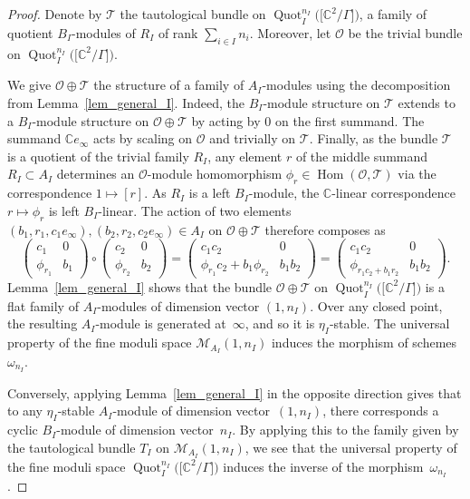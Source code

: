 \documentclass[pdftex]{sigma}%
\newcommand{\SC}{\mathbb{C}} %
\newcommand{\Hom}{\operatorname{Hom}}
\newcommand{\PiGamma}{B}
\newcommand{\PiQ}{A}
\DeclareMathOperator{\Quot}{\mathrm{Quot}}
\newcommand{\QuotI}[1][ ]{\Quot_I^{#1}}
\newcommand{\QuotInI}{\QuotI[n_I]}
\numberwithin{equation}{section}
\begin{document}
\begin{proof}
Denote by $\mathcal{T}$ the tautological bundle on $\QuotInI\big(\big[\SC^2/\Gamma\big]\big)$, a family of quotient $\PiGamma_I$-modules of $R_I$ of rank $\sum_{i \in I} n_i$. Moreover, let $\mathcal{O}$ be the trivial bundle on $\QuotInI\big(\big[\SC^2/\Gamma\big]\big)$.

We give $\mathcal{O}\oplus \mathcal{T}$ the structure of a family of $\PiQ_I$-modules using the decomposition from Lemma~\ref{lem_general_I}.
Indeed, the $\PiGamma_I$-module structure on $\mathcal{T}$ extends to a $\PiGamma_I$-module structure on $\mathcal{O}\oplus \mathcal{T}$ by acting by $0$ on the first summand. The summand $\SC e_\infty$ acts by scaling on $\mathcal{O}$ and trivially on $\mathcal{T}$. Finally, as the bundle $\mathcal{T}$ is a quotient of the trivial family $R_I$, any element $r$ of the middle summand $R_I \subset A_I$ determines an $\mathcal{O}$-module homomorphism $\phi_r \in \Hom(\mathcal{O},\mathcal{T})$ via the correspondence $1\mapsto [r]$. As $R_I$ is a left $\PiGamma_I$-module, the $\SC$-linear correspondence $r \mapsto \phi_r$ is left $\PiGamma_I$-linear. The action of two elements $(b_1,r_1,c_1 e_\infty), (b_2,r_2,c_2 e_\infty) \in \PiQ_I$ on $\mathcal{O}\oplus \mathcal{T}$ therefore composes as
\[ \begin{pmatrix}c_1 & 0 \\ \phi_{r_1} & b_1 \end{pmatrix} \circ \begin{pmatrix}c_2 & 0 \\ \phi_{r_2} & b_2 \end{pmatrix} = \begin{pmatrix}c_1c_2 & 0 \\ \phi_{r_1}c_2+b_1\phi_{r_2} & b_1b_2 \end{pmatrix}=\begin{pmatrix}c_1c_2 & 0 \\ \phi_{r_1c_2+b_1r_2} & b_1b_2 \end{pmatrix}.\]
Lemma~\ref{lem_general_I}
shows that
the bundle $\mathcal{O}\oplus \mathcal{T}$ on $\QuotInI\big(\big[\SC^2/\Gamma\big]\big)$
is a flat family of $\PiQ_I$-modules
of dimension vector $(1,n_I)$. Over any closed point, the resulting
$\PiQ_I$-module is generated at~$\infty$, and so it is $\eta_I$-stable.
The universal property of the fine moduli space $\mathcal{M}_{\PiQ_I}(1,n_I)$
induces the morphism of schemes~$\omega_{n_I}$.

Conversely, applying Lemma~\ref{lem_general_I}
in the opposite direction gives that to any $\eta_I$-stable $\PiQ_I$-module of dimension vector~$(1,n_I)$, there corresponds a cyclic $\PiGamma_I$-module of dimension vector~$n_I$. By applying this to the family given by the tautological bundle $T_I$ on $\mathcal{M}_{\PiQ_I}(1,n_I)$, we see that the universal property of the fine moduli space $\QuotInI\big(\big[\SC^2/\Gamma\big]\big)$
induces the inverse of the mor\-phism~$\omega_{n_I}$.
\end{proof}
\end{document}
